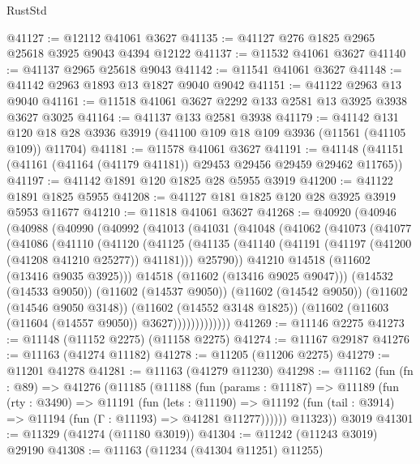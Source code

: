 \begin{lexlean}{RustStd}
\begin{coremodule}
@41127 := @12112 @41061 @3627
@41135 := @41127 @276 @1825 @2965 @25618 @3925 @9043 @4394 @12122
@41137 := @11532 @41061 @3627
@41140 := @41137 @2965 @25618 @9043
@41142 := @11541 @41061 @3627
@41148 := @41142 @2963 @1893 @13 @1827 @9040 @9042
@41151 := @41122 @2963 @13 @9040
@41161 := @11518 @41061 @3627 @2292 @133 @2581 @13 @3925 @3938 @3627 @3025
@41164 := @41137 @133 @2581 @3938
@41179 := @41142
    @131
    @120
    @18
    @28
    @3936
    @3919
    (@41100 @109 @18 @109 @3936 (@11561 (@41105 @109)) @11704)
@41181 := @11578 @41061 @3627
@41191 := @41148 (@41151 (@41161 (@41164 (@41179 @41181)) @29453 @29456 @29459 @29462 @11765))
@41197 := @41142 @1891 @120 @1825 @28 @5955 @3919
@41200 := @41122 @1891 @1825 @5955
@41208 := @41127 @181 @1825 @120 @28 @3925 @3919 @5953 @11677
@41210 := @11818 @41061 @3627
@41268 := @40920
    (@40946
      (@40988
        (@40990
          (@40992
            (@41013
              (@41031
                (@41048
                  (@41062
                    (@41073
                      (@41077
                        (@41086
                          (@41110
                            (@41120
                              (@41125
                                (@41135
                                  (@41140 (@41191 (@41197 (@41200 (@41208 @41210 @25277)) @41181)))
                                  @25790))
                              @41210
                              @14518
                              (@11602 (@13416 @9035 @3925)))
                            @14518
                            (@11602 (@13416 @9025 @9047)))
                          (@14532 (@14533 @9050))
                          (@11602 (@14537 @9050))
                          (@11602 (@14542 @9050))
                          (@11602 (@14546 @9050 @3148))
                          (@11602 (@14552 @3148 @1825))
                          (@11602 (@11603 (@11604 (@14557 @9050)) @3627)))))))))))))
@41269 := @11146 @2275
@41273 := @11148 (@11152 @2275) (@11158 @2275)
@41274 := @11167 @29187
@41276 := @11163 (@41274 @11182)
@41278 := @11205 (@11206 @2275)
@41279 := @11201 @41278
@41281 := @11163 (@41279 @11230)
@41298 := @11162
    (fun (fn : @89) =>
    @41276
      (@11185
        (@11188
          (fun (params : @11187) =>
          @11189
            (fun (rty : @3490) =>
            @11191
              (fun (lets : @11190) =>
              @11192 (fun (tail : @3914) => @11194 (fun (Γ : @11193) => @41281 @11277))))))
        @11323))
    @3019
@41301 := @11329 (@41274 (@11180 @3019))
@41304 := @11242 (@11243 @3019) @29190
@41308 := @11163 (@11234 (@41304 @11251) @11255)

\end{coremodule}
\end{lexlean}
